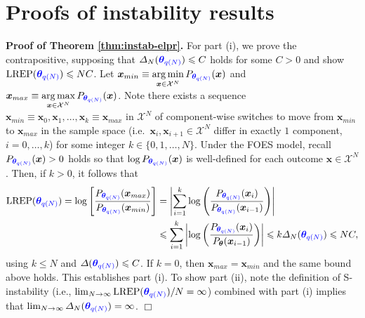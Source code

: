 \documentclass[numbib]{imamat}
\theoremstyle{theorem}
\theoremstyle{lemma}
\theoremstyle{example}
\theoremstyle{corollary}
\theoremstyle{definition}
\theoremstyle{remark}
\theoremstyle{approximation}
\theoremstyle{scheme}
\DeclareMathOperator*{\argmin}{arg\,min}
\DeclareMathOperator*{\argmax}{arg\,max}
\newcommand{\REP}{\mathrm{LREP}}
\newcommand{\DN}{\Delta_N}
\newcommand{\thetaidx}{q(N)}
\newcommand{\thetaN}{\boldsymbol \theta_{\thetaidx}}
\newcommand{\ak}[1]{{\color{blue} #1}}
\begin{document}
\clearpage

\hypertarget{appendix-appendix}{%
\appendix}


\hypertarget{appendix-instab}{%
\section{Proofs of instability results}\label{appendix-instab}}

\textbf{Proof of Theorem \ref{thm:instab-elpr}.} For part (i), we prove the contrapositive, supposing that \(\DN(\ak{\thetaN}) \le C\) holds for some \(C > 0\) and show \(\REP(\ak{\thetaN}) \leq NC\). Let \(\boldsymbol x_{min} \equiv \argmin\limits_{\boldsymbol x \in \mathcal{X}^N}P_{\ak{\thetaN}}(\boldsymbol x)\)
and \(\boldsymbol x_{max} \equiv \argmax\limits_{\boldsymbol x \in \mathcal{X}^N}P_{\ak{\thetaN}}(\boldsymbol x)\). Note there exists a sequence \(\boldsymbol x_{min} \equiv \boldsymbol x_0, \boldsymbol x_1, \dots, \boldsymbol x_k \equiv \boldsymbol x_{max}\) in \(\mathcal{X}^N\) of component-wise switches to move from \(\boldsymbol x_{min}\) to \(\boldsymbol x_{max}\) in the sample space (i.e.~\(\boldsymbol x_i, \boldsymbol x_{i + 1} \in \mathcal{X}^N\) differ in exactly \(1\) component, \(i = 0, \dots, k\)) for some integer \(k \in \{0, 1, \dots, N\}\). Under the FOES model, recall
\(P_{\ak{\thetaN}}(\boldsymbol x) > 0\) holds so that \(\log P_{\ak{\thetaN}}(\boldsymbol x)\) is well-defined for each outcome \(\boldsymbol x \in \mathcal{X}^N\). Then, if \(k > 0\), it follows that
\begin{align*}
\REP(\ak{\thetaN}) = \log\left[\frac{P_{\ak{\thetaN}}(\boldsymbol x_{max})}{P_{ \ak{\thetaN}}(\boldsymbol x_{min})}\right] &= \left|\sum\limits_{i = 1}^k\log\left(\frac{P_{\ak{\thetaN}}(\boldsymbol x_i)}{P_{\ak{\thetaN}}(\boldsymbol x_{i-1})}\right)\right| \\
&\le \sum\limits_{i = 1}^k\left|\log\left(\frac{P_{\ak{\thetaN}}(\boldsymbol x_i)}{P_{\boldsymbol \theta}(\boldsymbol x_{i-1})}\right)\right| \le k \Delta_N(\ak{\thetaN}) \le NC,
\end{align*}
using \(k \le N\) and \(\Delta(\ak{\thetaN}) \le C\). If \(k = 0\), then \(\boldsymbol x_{max} = \boldsymbol x_{min}\) and the same bound above holds. This establishes part (i). To show part (ii), note the definition of S-instability (i.e., \(\lim_{N\to \infty}\REP(\ak{\thetaN})/N= \infty\)) combined with part (i) implies that \(\lim_{N\to \infty}\DN(\ak{\thetaN})=\infty\). \hfill \(\Box\)
\end{document}
